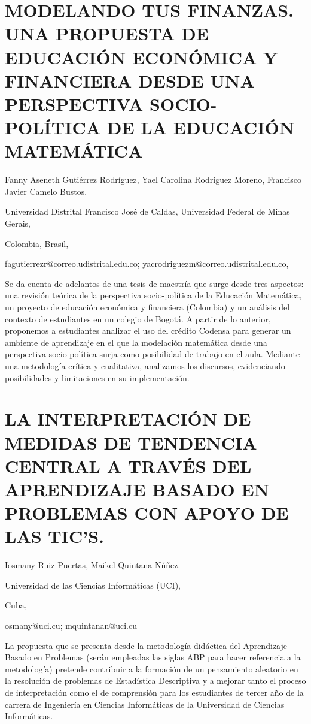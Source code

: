 \section{MODELANDO TUS FINANZAS. UNA PROPUESTA DE EDUCACIÓN ECONÓMICA Y FINANCIERA
DESDE UNA PERSPECTIVA SOCIO-POLÍTICA DE LA EDUCACIÓN MATEMÁTICA }

\begin{datos}

Fanny Aseneth Gutiérrez Rodríguez, Yael Carolina Rodríguez Moreno,
Francisco Javier Camelo Bustos.

Universidad Distrital Francisco José de Caldas, Universidad Federal
de Minas Gerais,

Colombia, Brasil,

fagutierrezr@correo.udistrital.edu.co; yacrodriguezm@correo.udistrital.edu.co, 

\end{datos}

Se da cuenta de adelantos de una tesis de maestría que surge desde
tres aspectos: una revisión teórica de la perspectiva socio-política
de la Educación Matemática, un proyecto de educación económica y financiera
(Colombia) y un análisis del contexto de estudiantes en un colegio
de Bogotá. A partir de lo anterior, proponemos a estudiantes analizar
el uso del crédito Codensa para generar un ambiente de aprendizaje
en el que la modelación matemática desde una perspectiva socio-política
surja como posibilidad de trabajo en el aula. Mediante una metodología
crítica y cualitativa, analizamos los discursos, evidenciando posibilidades
y limitaciones en su implementación.


\section{LA INTERPRETACIÓN DE MEDIDAS DE TENDENCIA CENTRAL A TRAVÉS DEL APRENDIZAJE
BASADO EN PROBLEMAS CON APOYO DE LAS TIC’S.}

\begin{datos}

Iosmany Ruiz Puertas, Maikel Quintana Núñez.

Universidad de las Ciencias Informáticas (UCI),

Cuba,

osmany@uci.cu; mquintanan@uci.cu 

\end{datos}

La propuesta que se presenta desde la metodología didáctica del Aprendizaje
Basado en Problemas (serán empleadas las siglas ABP para hacer referencia
a la metodología) pretende contribuir a la formación de un pensamiento
aleatorio en la resolución de problemas de Estadística Descriptiva
y a mejorar tanto el proceso de interpretación como el de comprensión
para los estudiantes de tercer año de la carrera de Ingeniería en
Ciencias Informáticas de la Universidad de Ciencias Informáticas.


